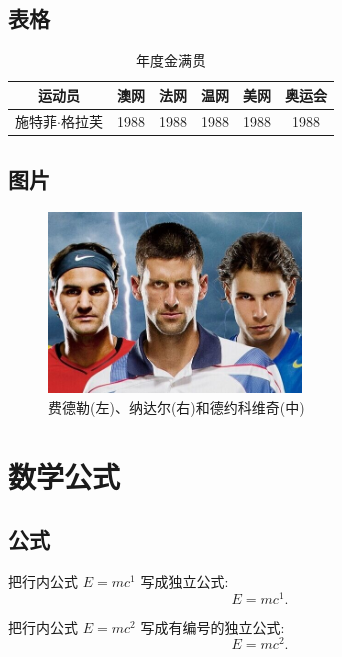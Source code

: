 \documentclass{ctexart}
\begin{document}
    \subsection{表格}
    \begin{table}[htbp]
        \centering
        \begin{tabular}{c|ccccc}
            \hline
            运动员 & 澳网 & 法网 & 温网 & 美网 & 奥运会\\
            \hline
            施特菲$\cdot{}$格拉芙 & 1988 & 1988 & 1988 & 1988 & 1988 \\
            \hline
        \end{tabular}
        \caption{年度金满贯}
        \label{table} %
    \end{table}
    \subsection{图片}
    \begin{figure}[htbp]
        \centering
        \includegraphics[width=0.6\textwidth]{img/FND.jpg}
        \caption{费德勒(左)、纳达尔(右)和德约科维奇(中)}
        \label{figure} %
    \end{figure}
    \section{数学公式}
    \subsection{公式}
    把行内公式 $E=mc^1$ 写成独立公式:
    \begin{equation*}
        E=mc^1.
    \end{equation*}

    把行内公式 $E=mc^2$ 写成有编号的独立公式:
    \begin{equation}
        E=mc^2. \label{eq2}
    \end{equation}
\end{document}
